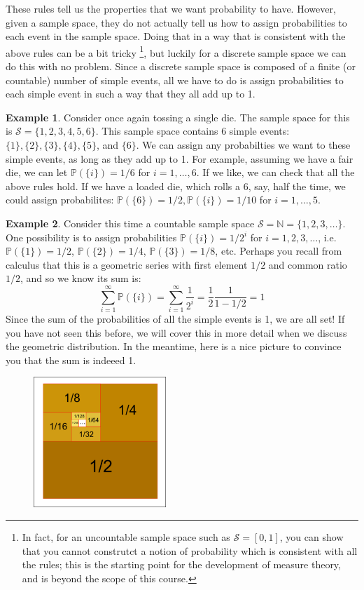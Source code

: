 \documentclass[12pt]{article}
\theoremstyle{definition}
\newtheorem*{example}{Example}
\theoremstyle{remark}
\def\N{{\mathbb N}}
\def\P{{\mathbb P}}
\def\cals{{\mathcal S}}
\begin{document}
These rules tell us the properties that we want probability to have. However, given a sample space, they do not actually tell us how to assign probabilities to each event in the sample space. Doing that in a way that is consistent with the above rules can be a bit tricky \footnote{In fact, for an uncountable sample space such as $\cals = [0, 1]$, you can show that you cannot construtct a notion of probability which is consistent with all the rules; this is the starting point for the development of measure theory, and is beyond the scope of this course.}, but luckily for a discrete sample space we can do this with no problem. Since a discrete sample space is composed of a finite (or countable) number of simple events, all we have to do is assign probabilities to each simple event in such a way that they all add up to 1.

\begin{example}Consider once again tossing a single die. The sample space for this is $\cals = \{1, 2, 3, 4, 5, 6\}$. This sample space contains 6 simple events: $\{1\}, \{2\}, \{3\},\{4\}, \{5\}$, and $\{6\}$. We can assign any probabilties we want to these simple events, as long as they add up to 1. For example, assuming we have a fair die, we can let $\P(\{i\}) = 1/6$ for $i = 1, \dots, 6$. If we like, we can check that all the above rules hold. If we have a loaded die, which rolls a 6, say, half the time, we could assign probabilites: $\P(\{6\}) = 1/2, \P(\{i\}) = 1/10$ for $i = 1, \dots, 5$.
\end{example}

\begin{example}Consider this time a countable sample space $\cals = \N = \{1, 2, 3, \dots\}$. One possibility is to assign probabilities $\P(\{i\}) = 1/2^i$ for $i = 1, 2, 3, \dots$, i.e. $\P(\{1\}) = 1/2$, $\P(\{2\}) = 1/4$, $\P(\{3\}) = 1/8$, etc. Perhaps you recall from calculus that this is a geometric series with first element $1/2$ and common ratio $1/2$, and so we know its sum is:
\[
\sum_{i = 1}^{\infty} \P(\{i\}) = \sum_{i = 1}^{\infty} \frac{1}{2^i} = \frac{1}{2}\frac{1}{1 - 1/2} = 1
\]
Since the sum of the probabilities of all the simple events is 1, we are all set! If you have not seen this before, we will cover this in more detail when we discuss the geometric distribution. In the meantime, here is a nice picture to convince you that the sum is indeeed 1.
\begin{figure}[H]
\centering
\includegraphics[width=5cm]{Geometric_series}
\end{figure}
\end{example}
\end{document}
